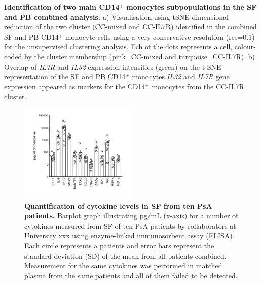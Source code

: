 \caption[Identification of two main CD14$^+$ monocytes subpopulations in the SF and PB combined analysis]{\textbf{Identification of two main CD14$^+$ monocytes subpopulations in the SF and PB combined analysis.} a) Visualisation using tSNE dimensional reduction of the two cluster (CC-mixed and CC-IL7R) identified in the combined SF and PB CD14$^+$ monocyte cells using a very conservative resolution (res=0.1) for the unsupervised clustering analysis. Ech of the dots represents a cell, colour-coded by the cluster membership (pink=CC-mixed and turquoise=CC-IL7R). b) Overlap of \textit{IL7R} and \textit{IL32} expression intensities (green) on the t-SNE representation of the SF and PB CD14$^+$ monocytes.\textit{IL32} and \textit{IL7R} gene expression appeared as markers for the CD14$^+$ monocytes from the CC-IL7R cluster.}

\begin{figure}[htbp]
\centering
\includegraphics[width=0.5\textwidth]{./Appendix/pdfs/Chapter5/PSA_SF_elisa_cytokines_quantification}
\caption[Quantification of cytokine levels in SF from ten PsA patients.]{\textbf{Quantification of cytokine levels in SF from ten PsA patients.} Barplot graph illustrating pg/mL (x-axis) for a number of cytokines measured from SF of ten PsA patients by collaborators at University xxx using enzyme-linked immunosorbent assay (ELISA). Each circle represents a patients and error bars represent the standard deviation (SD) of the mean from all patients combined. Measurement for the same cytokines was performed in matched plasma from the same patients and all of them failed to be detected.}
\label{figure:ELISA_SF_PsA}
\end{figure}
